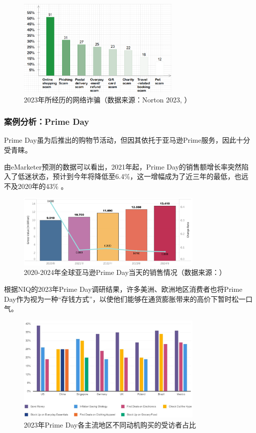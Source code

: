\documentclass[12pt]{ctexart}
\begin{document}
\begin{figure}[htbp!]
    \centering
    \includegraphics[width=0.7\textwidth]{Images/10.png}
    \caption{2023年所经历的网络诈骗（数据来源：Norton 2023, \cite{11}）}
    \label{scam}
\end{figure}



\subsubsection{案例分析：Prime Day}
Prime Day虽为后推出的购物节活动，但因其依托于亚马逊Prime服务，因此十分受青睐。

由eMarketer预测的数据可以看出，2021年起，Prime Day的销售额增长率突然陷入了低迷状态，预计到今年将降低至6.4\%，这一增幅成为了近三年的最低，也远不及2020年的43\% \cite{12}。

\begin{figure}[htbp!]
    \centering
    \includegraphics[width=0.8\textwidth]{Images/12.png}
    \caption{2020-2024年全球亚马逊Prime Day当天的销售情况（数据来源：\cite{12}）}
    \label{scam}
\end{figure}

根据NIQ的2023年Prime Day调研结果，许多美洲、欧洲地区消费者也将Prime Day作为视为一种“存钱方式”，以使他们能够在通货膨胀带来的高价下暂时松一口气\cite{14}。

\begin{figure}[htbp!]
    \centering
    \includegraphics[width=0.8\textwidth]{Images/13.png}
    \caption{2023年Prime Day各主流地区不同动机购买的受访者占比 \cite{14}}
    \label{purpose}
\end{figure}
\end{document}
